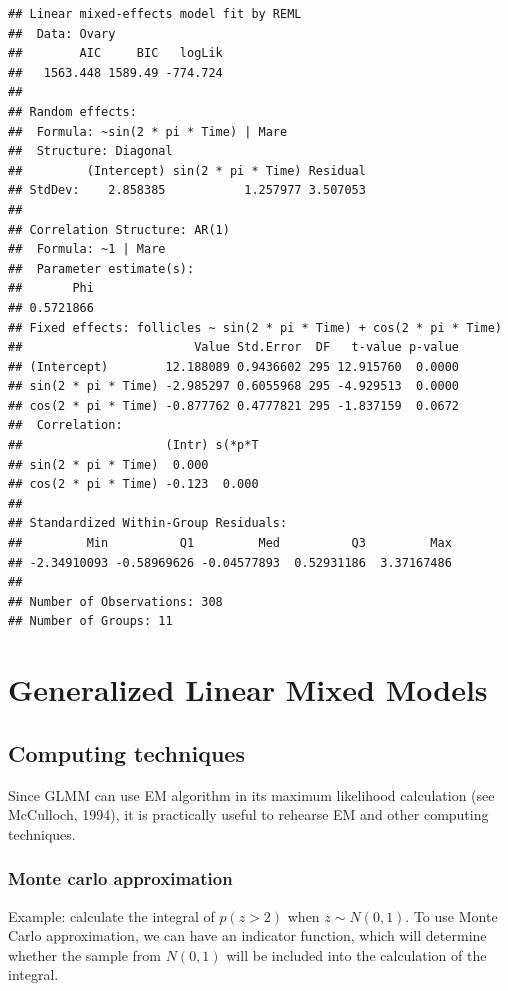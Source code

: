 \documentclass[]{book}
\begin{document}
\begin{verbatim}
## Linear mixed-effects model fit by REML
##  Data: Ovary 
##        AIC     BIC   logLik
##   1563.448 1589.49 -774.724
## 
## Random effects:
##  Formula: ~sin(2 * pi * Time) | Mare
##  Structure: Diagonal
##         (Intercept) sin(2 * pi * Time) Residual
## StdDev:    2.858385           1.257977 3.507053
## 
## Correlation Structure: AR(1)
##  Formula: ~1 | Mare 
##  Parameter estimate(s):
##       Phi 
## 0.5721866 
## Fixed effects: follicles ~ sin(2 * pi * Time) + cos(2 * pi * Time) 
##                        Value Std.Error  DF   t-value p-value
## (Intercept)        12.188089 0.9436602 295 12.915760  0.0000
## sin(2 * pi * Time) -2.985297 0.6055968 295 -4.929513  0.0000
## cos(2 * pi * Time) -0.877762 0.4777821 295 -1.837159  0.0672
##  Correlation: 
##                    (Intr) s(*p*T
## sin(2 * pi * Time)  0.000       
## cos(2 * pi * Time) -0.123  0.000
## 
## Standardized Within-Group Residuals:
##         Min          Q1         Med          Q3         Max 
## -2.34910093 -0.58969626 -0.04577893  0.52931186  3.37167486 
## 
## Number of Observations: 308
## Number of Groups: 11
\end{verbatim}

\chapter{Generalized Linear Mixed
Models}\label{generalized-linear-mixed-models}

\section{Computing techniques}\label{computing-techniques}

Since GLMM can use EM algorithm in its maximum likelihood calculation
(see McCulloch, 1994), it is practically useful to rehearse EM and other
computing techniques.

\subsection{Monte carlo approximation}\label{monte-carlo-approximation}

Example: calculate the integral of \(p(z>2)\) when \(z \sim N(0,1)\). To
use Monte Carlo approximation, we can have an indicator function, which
will determine whether the sample from \(N(0,1)\) will be included into
the calculation of the integral.
\end{document}
